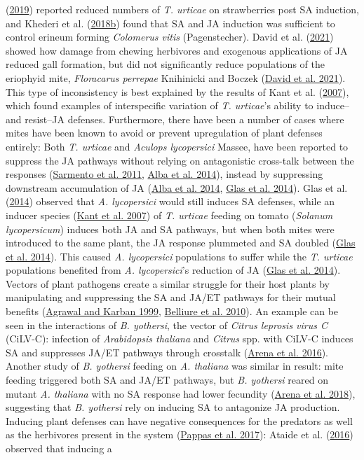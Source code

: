 \documentclass{ufdissertation}[overrideChapters] %
\begin{document}
{(\protect\hyperlink{ref-Favaro2019}{2019}) reported reduced numbers of \emph{T. urticae} on strawberries post SA induction, and Khederi et al. (\protect\hyperlink{ref-Khederi2018}{2018b}) found that SA and JA induction was sufficient to control erineum forming \emph{Colomerus vitis} (Pagenstecher). David et al. (\protect\hyperlink{ref-David2021}{2021}) showed how damage from chewing herbivores and exogenous applications of JA reduced gall formation, but did not significantly reduce populations of the eriophyid mite, \emph{Floracarus perrepae} Knihinicki and Boczek (\protect\hyperlink{ref-David2021}{David et al. 2021}). This type of inconsistency is best explained by the results of Kant et al. (\protect\hyperlink{ref-Kant2007}{2007}), which found examples of interspecific variation of \emph{T. urticae}'s ability to induce--and resist--JA defenses. Furthermore, there have been a number of cases where mites have been known to avoid or prevent upregulation of plant defenses entirely: Both \emph{T. urticae} and \emph{Aculops lycopersici} Massee, have been reported to suppress the JA pathways without relying on antagonistic cross-talk between the responses (\protect\hyperlink{ref-Sarmento2011}{Sarmento et al. 2011}, \protect\hyperlink{ref-Alba2014}{Alba et al. 2014}), instead by suppressing downstream accumulation of JA (\protect\hyperlink{ref-Alba2014}{Alba et al. 2014}, \protect\hyperlink{ref-Glas2014}{Glas et al. 2014}). Glas et al. (\protect\hyperlink{ref-Glas2014}{2014}) observed that \emph{A. lycopersici} would still induces SA defenses, while an inducer species (\protect\hyperlink{ref-Kant2007}{Kant et al. 2007}) of \emph{T. urticae} feeding on tomato (\emph{Solanum lycopersicum}) induces both JA and SA pathways, but when both mites were introduced to the same plant, the JA response plummeted and SA doubled (\protect\hyperlink{ref-Glas2014}{Glas et al. 2014}). This caused \emph{A. lycopersici} populations to suffer while the \emph{T. urticae} populations benefited from \emph{A. lycopersici}'s reduction of JA (\protect\hyperlink{ref-Glas2014}{Glas et al. 2014}). Vectors of plant pathogens create a similar struggle for their host plants by manipulating and suppressing the SA and JA/ET pathways for their mutual benefits (\protect\hyperlink{ref-Agrawal1999}{Agrawal and Karban 1999}, \protect\hyperlink{ref-Belliure2010}{Belliure et al. 2010}). An example can be seen in the interactions of \emph{B. yothersi}, the vector of \emph{Citrus leprosis virus C} (CiLV-C): infection of \emph{Arabidopsis thaliana} and \emph{Citrus} spp. with CiLV-C induces SA and suppresses JA/ET pathways through crosstalk (\protect\hyperlink{ref-Arena2016}{Arena et al. 2016}). Another study of \emph{B. yothersi} feeding on \emph{A. thaliana} was similar in result: mite feeding triggered both SA and JA/ET pathways, but \emph{B. yothersi} reared on mutant \emph{A. thaliana} with no SA response had lower fecundity (\protect\hyperlink{ref-Arena2018}{Arena et al. 2018}), suggesting that \emph{B. yothersi} rely on inducing SA to antagonize JA production. Inducing plant defenses can have negative consequences for the predators as well as the herbivores present in the system (\protect\hyperlink{ref-Pappas2017}{Pappas et al. 2017}): Ataide et al. (\protect\hyperlink{ref-Ataide2016}{2016}) observed that inducing a }
\end{document}
